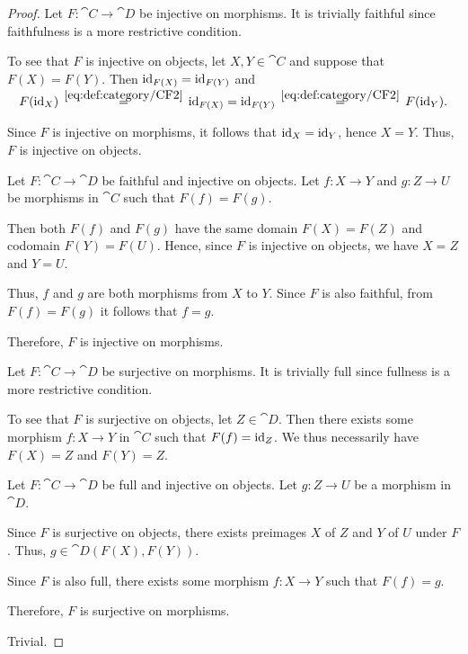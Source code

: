 \begin{proof}
  \SufficiencySubProof* Let \( F: \cat{C} \to \cat{D} \) be injective on morphisms. It is trivially faithful since faithfulness is a more restrictive condition.

  To see that \( F \) is injective on objects, let \( X, Y \in \cat{C} \) and suppose that \( F(X) = F(Y) \). Then \( \operatorname{id}_{F(X)} = \operatorname{id}_{F(Y)} \) and
  \begin{equation*}
    F(\id_X)
    \reloset {\eqref{eq:def:category/CF2}} =
    \id_{F(X)}
    =
    \id_{F(Y)}
    \reloset {\eqref{eq:def:category/CF2}} =
    F(\id_Y).
  \end{equation*}

  Since \( F \) is injective on morphisms, it follows that \( \operatorname{id}_X = \operatorname{id}_Y \), hence \( X = Y \). Thus, \( F \) is injective on objects.

  \NecessitySubProof* Let \( F: \cat{C} \to \cat{D} \) be faithful and injective on objects. Let \( f: X \to Y \) and \( g: Z \to U \) be morphisms in \( \cat{C} \) such that \( F(f) = F(g) \).

  Then both \( F(f) \) and \( F(g) \) have the same domain \( F(X) = F(Z) \) and codomain \( F(Y) = F(U) \). Hence, since \( F \) is injective on objects, we have \( X = Z \) and \( Y = U \).

  Thus, \( f \) and \( g \) are both morphisms from \( X \) to \( Y \). Since \( F \) is also faithful, from \( F(f) = F(g) \) it follows that \( f = g \).

  Therefore, \( F \) is injective on morphisms.

  \SufficiencySubProof* Let \( F: \cat{C} \to \cat{D} \) be surjective on morphisms. It is trivially full since fullness is a more restrictive condition.

  To see that \( F \) is surjective on objects, let \( Z \in \cat{D} \). Then there exists some morphism \( f: X \to Y \) in \( \cat{C} \) such that \( F(f) = \operatorname{id}_Z \). We thus necessarily have \( F(X) = Z \) and \( F(Y) = Z \).

  \NecessitySubProof* Let \( F: \cat{C} \to \cat{D} \) be full and injective on objects. Let \( g: Z \to U \) be a morphism in \( \cat{D} \).

  Since \( F \) is surjective on objects, there exists preimages \( X \) of \( Z \) and \( Y \) of \( U \) under \( F \). Thus, \( g \in \cat{D}(F(X), F(Y)) \).

  Since \( F \) is also full, there exists some morphism \( f: X \to Y \) such that \( F(f) = g \).

  Therefore, \( F \) is surjective on morphisms.

   Trivial.
\end{proof}


